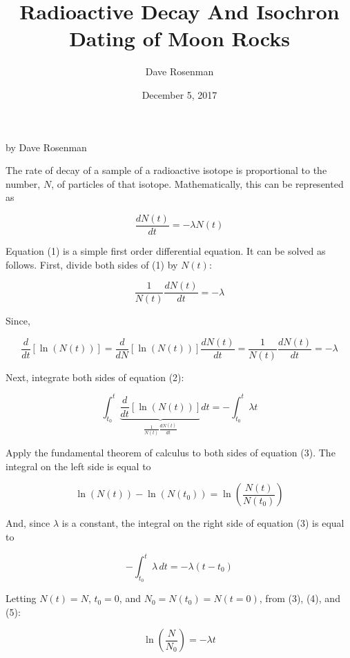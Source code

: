 \documentclass[11pt]{article}
\title{Radioactive Decay And Isochron Dating of Moon Rocks}
\author{Dave Rosenman}
\date{December 5, 2017}
\begin{document}
\maketitle

by Dave Rosenman

The rate of decay of a sample of a radioactive isotope is proportional to the number, $N$, of particles of that isotope. Mathematically, this can be represented as

\begin{equation}
\frac{dN(t)}{dt} = -\lambda N(t)
\end{equation}

Equation (1) is a simple first order differential equation. It can be solved as follows. First, divide both sides of (1) by $N(t)$:

\[
\frac{1}{N(t)}\frac{dN(t)}{dt} = -\lambda
\]

Since,

\begin{equation}
\frac{d}{dt}\left[\ln(N(t))\right]
=
\frac{d}{dN}\left[\ln(N(t))\right]\frac{dN(t)}{dt}
=
\frac{1}{N(t)}\frac{dN(t)}{dt}
=
-\lambda
\end{equation}

Next, integrate both sides of equation (2):

\begin{equation}
\int_{{t_0}}^t {\underbrace {\frac{d}{{dt}}\left[ {\ln \left( {N\left( t \right)} \right)} \right]}_{\frac{1}{{N\left( t \right)}}\frac{{dN\left( t \right)}}{{dt}}}dt}  =  - \int_{{t_0}}^t {\lambda t} 
\end{equation}

Apply the fundamental theorem of calculus to both sides of equation (3). The integral on the left side is equal to

\begin{equation}
\ln(N(t)) - \ln(N(t_0))
=
\ln\!\left(\frac{N(t)}{N(t_0)}\right)
\end{equation}

And, since $\lambda$ is a constant, the integral on the right side of equation (3) is equal to

\begin{equation}
-\int_{t_0}^{t}\lambda\,dt = -\lambda (t-t_0)
\end{equation}

Letting $N(t)=N$, $t_0=0$, and $N_0=N(t_0)=N(t=0)$, from (3), (4), and (5):

\[
\ln\!\left(\frac{N}{N_0}\right)=-\lambda t
\]
\end{document}
